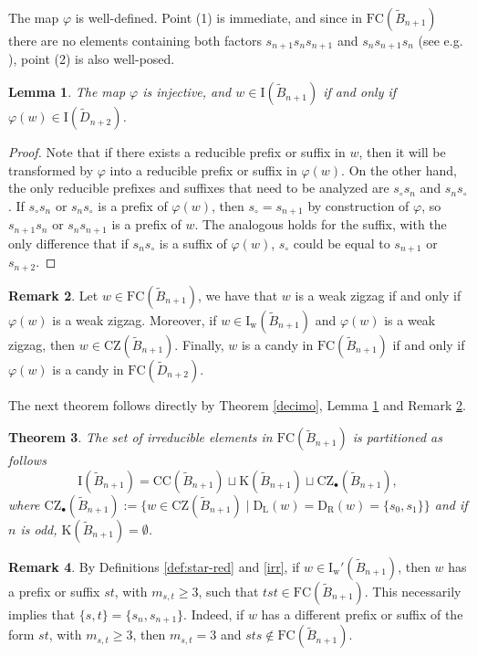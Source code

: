 \documentclass{amsart}
\newcommand{\D}{{\widetilde{D}_{n+2}}}
\newcommand{\B}{{\widetilde{B}_{n+1}}}
\newcommand{\ld}{{\mathrm{D}_{\mathrm{L}}}}
\newcommand{\rd}{{\mathrm{D}_{\mathrm{R}}}}
\newcommand{\fc}{{\mathrm{FC}}}
\newcommand{\sn}{{s_\circ}}
\newcommand{\TTC}{\mathrm{CC}}
\newcommand{\zz}{\mathrm{CZ}}
\newcommand{\car}{\mathrm{K}}
\newcommand{\IR}{\mathrm{I_w}}
\newcommand{\IRc}{\mathrm{I_w'}}
\newcommand{\I}{\mathrm{I}}
\newcommand{\nmap}{\varphi}
\newtheorem{Theorem}{Theorem}[section]
\newtheorem{Lemma}[Theorem]{Lemma}
\theoremstyle{definition}
\newtheorem{Remark}[Theorem]{Remark}
\begin{document}
The map $\nmap$ is well-defined. Point (1) is immediate, and since in $\fc(\B)$ there are no elements containing both factors $s_{n+1}s_{n}s_{n+1}$ and $s_ns_{n+1}s_n$ (see e.g. \cite[\S 3.2]{BJNFC}), point (2) is also well-posed.


\begin{Lemma}\label{lemma:mubij}
    The map $\nmap$ is injective, and $w\in \I(\B)$ if and only if $\nmap(w)\in \I(\D)$.
\end{Lemma}

\begin{proof}
   Note that if there exists a reducible prefix or suffix in $w$, then it will be transformed by $\nmap$ into a reducible prefix or suffix in $\nmap(w)$. 
   On the other hand, the only reducible prefixes and suffixes that need to be analyzed are $\sn s_n$ and $s_n \sn$. If $\sn s_n$ or $s_n\sn$ is a prefix of $\nmap(w)$, then $\sn=s_{n+1}$ by construction of $\nmap$, so $s_{n+1}s_n$ or $s_ns_{n+1}$ is a prefix of $w$. The analogous holds for the suffix, with the only difference that if $s_n\sn$ is a suffix of $\nmap(w)$, $\sn$ could be equal to $s_{n+1}$ or $s_{n+2}$.  
\end{proof}

\begin{Remark}
\label{remark:weakzigBeD}
    Let $w\in \fc(\B)$, we have that $w$ is a weak zigzag if and only if $\nmap(w)$ is a weak zigzag. Moreover, if $w\in \IR(\B)$ and $\nmap(w)$ is a weak zigzag, then $w\in \zz(\B)$. Finally, $w$ is a candy in $\fc(\B)$ if and only if $\nmap(w)$ is a candy in $\fc(\D)$. 
\end{Remark}

The next theorem follows directly by Theorem \ref{decimo}, Lemma \ref{lemma:mubij} and Remark \ref{remark:weakzigBeD}.

\begin{Theorem}\label{theorem:classredB}
The set of irreducible elements in $\fc(\B)$ is partitioned as follows
    $$\I(\B)=\TTC(\B)\sqcup \car(\B)\sqcup \zz_\bullet(\B),$$
where $\zz_\bullet(\B):=\{w\in \zz(\B)\mid \ld(w)=\rd(w)=\{s_0,s_1\}\}$ and if $n$ is odd, $\car(\B)=\emptyset$.
\end{Theorem}

\smallskip

\begin{Remark}\label{rem:prefirrB}
    By Definitions \ref{def:star-red} and \ref{irr}, if $w\in \IRc(\B)$, then $w$ has a prefix or suffix $st$, with $m_{s,t}\ge3$, such that $tst\in \fc(\B)$. This necessarily implies that $\{s,t\}=\{s_n, s_{n+1}\}$. Indeed, if $w$ has a different prefix or suffix of the form $st$, with $m_{s,t}\geq 3$, then $m_{s,t}=3$ and $sts\notin \fc(\B)$.
\end{Remark}
\end{document}
